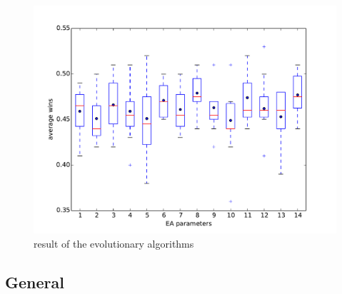 \begin{figure}
\centering
\includegraphics[scale=0.7]{images/eval_evolutionary.pdf}
\caption{result of the evolutionary algorithms}
\label{fig:eval_evo}
\end{figure}







\subsection{General} 